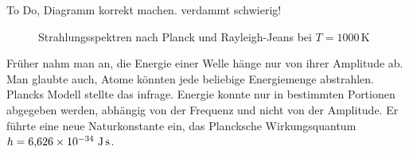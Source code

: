 	
	
	

	To Do, Diagramm korrekt machen. verdammt schwierig!

		
	\begin{figure}[htbp]
		\centering
		\caption{Strahlungsspektren nach Planck und Rayleigh-Jeans bei $T=1000\,\mathrm{K}$}
	\end{figure}
		

	



	
	
	
	Früher nahm man an, die Energie einer Welle hänge nur von ihrer Amplitude ab. 
	Man glaubte auch, Atome könnten jede beliebige Energiemenge abstrahlen. Plancks Modell stellte das infrage. 
	Energie konnte nur in bestimmten Portionen abgegeben werden, abhängig von der Frequenz und nicht von der Amplitude.
    Er führte eine neue Naturkonstante ein, das Plancksche Wirkungsquantum $h = 6{,}626 \times 10^{-34} \ \text{J\,s}$. 
	
